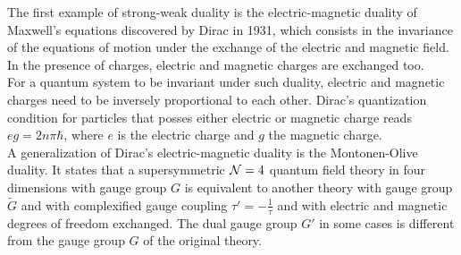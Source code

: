 The first example of strong-weak duality is the electric-magnetic duality of Maxwell's equations discovered by Dirac in 1931, which consists in the invariance of the equations of motion under the exchange of the electric and magnetic field. 
In the presence of charges, electric and magnetic charges are exchanged too. \\
For a quantum system to be invariant under such duality, electric and magnetic charges need to be inversely proportional to each other. 
Dirac's quantization condition for particles that posses either electric or magnetic charge reads $e g =  2 n \pi \hbar$, where $e$ is the electric charge and $g$ the magnetic charge.
\\

A generalization of Dirac's electric-magnetic duality is the Montonen-Olive duality.
It states that a supersymmetric  $\mathcal{N}=4$ quantum field theory in four dimensions with gauge group $G$ is equivalent to another theory with gauge group $\tilde{G}$ and with complexified gauge coupling $\tau' = - \frac{1}{\tau}$ and with electric and magnetic degrees of freedom exchanged.
The dual gauge group $G'$ in some cases is different from the gauge group $G$ of the original theory.
\\


